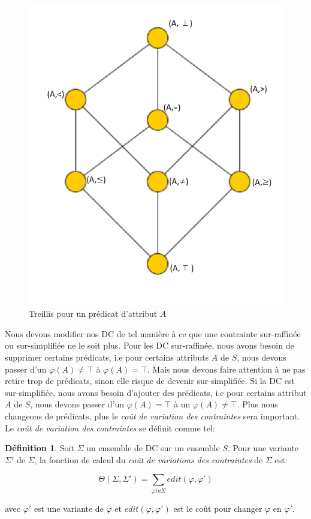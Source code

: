 \documentclass[letterpaper, 12pt]{report}
\theoremstyle{definition}
\newtheorem{mydef}{Définition}
\begin{document}
\begin{figure}
	\centering
	\includegraphics[scale=0.5]{img/treillis}
	\caption{\label{treillis} Treillis pour un prédicat d'attribut $A$}
\end{figure}

Nous devons modifier nos DC de tel manière à ce que une contrainte sur-raffinée ou sur-simplifiée ne le soit plus. Pour les DC sur-raffinée, nous avons besoin de supprimer certains prédicats, i.e pour certains attributs $A$ de $S$, nous devons passer d'un $\varphi(A)\neq \top$ à $\varphi(A) = \top$. Mais nous devons faire attention à ne pas retire trop de prédicats, sinon elle risque de devenir sur-simplifiée.  Si la DC est sur-simplifiée, nous avons besoin d'ajouter des prédicats, i.e pour certains attribut $A$ de $S$, nous devons passer d'un $\varphi(A) = \top$ à un $\varphi(A) \neq \top$. Plus nous changeons de prédicats, plus le \emph{coût de variation des contraintes} sera important. Le \emph{coût de variation des contraintes} se définit comme tel: 

\begin{mydef}
Soit $\Sigma$ un ensemble de DC sur un ensemble $S$. Pour une variante $\Sigma '$ de $\Sigma$, la fonction de calcul du \emph{coût de variations des contraintes} de $\Sigma$ est:

$$\Theta (\Sigma,\Sigma ') = \sum_{\varphi in \Sigma} edit(\varphi,\varphi ')$$

\hspace*{2cm} avec $\varphi '$ est une variante de $\varphi$ et $edit(\varphi,\varphi ')$ est le coût pour changer $\varphi$ en $\varphi'$.
\end{mydef}
\end{document}
